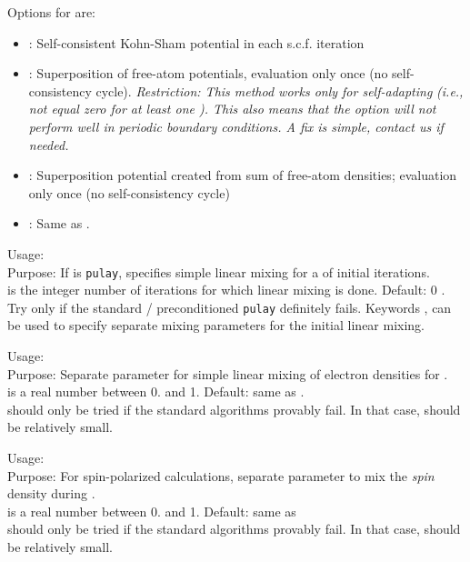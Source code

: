 Options for  are:
\begin{itemize}
  \item {}: Self-consistent Kohn-Sham potential in each
    s.c.f. iteration
  \item {}: Superposition of free-atom potentials,
    evaluation only once (no self-consistency cycle). \emph{Restriction: This
    method works only for self-adapting} 
    \emph{(i.e.,}  \emph{not equal zero for at least one
    ). This also means that the option will not perform well
    in periodic boundary conditions. A fix is simple, contact us if needed.}
  \item {}: Superposition potential created from sum of
    free-atom densities; evaluation only once (no self-consistency cycle)
  \item {}: Same as .
\end{itemize}

{
  \noindent
  Usage:   \\[1.0ex]
  Purpose: If  is \texttt{pulay}, specifies simple
    linear mixing for a  of initial iterations. \\[1.0ex]
   is the integer number of iterations for which linear
    mixing is done. Default: 0 . \\
}
Try only if the standard / preconditioned \texttt{pulay}
 definitely fails. Keywords
, 
can be used to specify separate mixing parameters for the initial
linear mixing.

{
  \noindent
  Usage:   \\[1.0ex]
  Purpose: Separate parameter for simple linear mixing of electron
  densities for . \\[1.0ex]
   is a real number between 0. and 1. Default: same as
  . \\
}
 should only be tried if the standard
algorithms provably fail. In that case,  should be
relatively small.

{
  \noindent
  Usage:   \\[1.0ex]
  Purpose: For spin-polarized calculations, separate parameter to mix
    the \emph{spin} density during
  . \\[1.0ex]
   is a real number between 0. and 1. Default: same as
   \\
}
 should only be tried if the standard
algorithms provably fail. In that case,  should be
relatively small.

